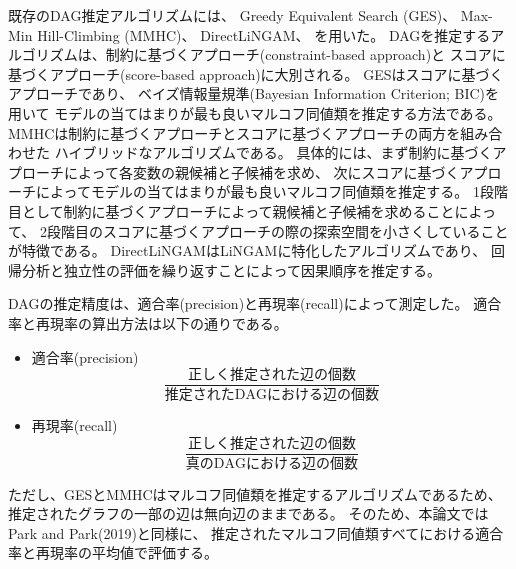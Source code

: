 既存のDAG推定アルゴリズムには、
Greedy Equivalent Search (GES)\cite{Chickering2002-iq}、
Max-Min Hill-Climbing (MMHC)\cite{Tsamardinos2006-qe}、
DirectLiNGAM\cite{Shimizu2011-pd}、
を用いた。
DAGを推定するアルゴリズムは、制約に基づくアプローチ(constraint-based approach)と
スコアに基づくアプローチ(score-based approach)に大別される。
GESはスコアに基づくアプローチであり、
ベイズ情報量規準(Bayesian Information Criterion; BIC)を用いて
モデルの当てはまりが最も良いマルコフ同値類を推定する方法である。
MMHCは制約に基づくアプローチとスコアに基づくアプローチの両方を組み合わせた
ハイブリッドなアルゴリズムである。
具体的には、まず制約に基づくアプローチによって各変数の親候補と子候補を求め、
次にスコアに基づくアプローチによってモデルの当てはまりが最も良いマルコフ同値類を推定する。
1段階目として制約に基づくアプローチによって親候補と子候補を求めることによって、
2段階目のスコアに基づくアプローチの際の探索空間を小さくしていることが特徴である。
DirectLiNGAMはLiNGAM\cite{Shimizu2006-yu}に特化したアルゴリズムであり、
回帰分析と独立性の評価を繰り返すことによって因果順序を推定する。

DAGの推定精度は、適合率(precision)と再現率(recall)によって測定した。
適合率と再現率の算出方法は以下の通りである。
\begin{itemize}
  \item 適合率(precision)
  \begin{equation*}
    \frac{\text{正しく推定された辺の個数}}{\text{推定されたDAGにおける辺の個数}}
  \end{equation*}

  \item 再現率(recall)
  \begin{equation*}
    \frac{\text{正しく推定された辺の個数}}{\text{真のDAGにおける辺の個数}}
  \end{equation*}
\end{itemize}
ただし、GESとMMHCはマルコフ同値類を推定するアルゴリズムであるため、
推定されたグラフの一部の辺は無向辺のままである。
そのため、本論文ではPark and Park(2019)\cite{Park2019-qy}と同様に、
推定されたマルコフ同値類すべてにおける適合率と再現率の平均値で評価する。
